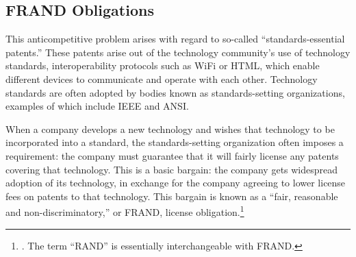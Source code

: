 \documentclass[11pt,twocolumn,titlepage]{article}
\begin{document}
\subsection{FRAND Obligations}
\SectionNote

This anticompetitive problem arises with regard to so-called
``standards-essential patents.'' These patents arise out of the technology
community's use of technology standards, interoperability protocols
such as WiFi or HTML, which enable different devices to communicate and operate
with each other.
Technology standards are often adopted by bodies known as
standards-setting organizations, examples of which include IEEE and
ANSI.

When a company develops a new technology and wishes that technology to be
incorporated into a standard, the standards-setting organization often imposes
a requirement: the company must guarantee that it will fairly license any
patents covering that technology.
This is a basic bargain: the company gets
widespread adoption of its technology, in exchange for the company agreeing to
lower license fees on patents to that technology.
This bargain is known as a
``fair, reasonable and non-discriminatory,'' or FRAND, license
obligation.\footnote{. The
term ``RAND'' is essentially interchangeable with FRAND.}
\end{document}
